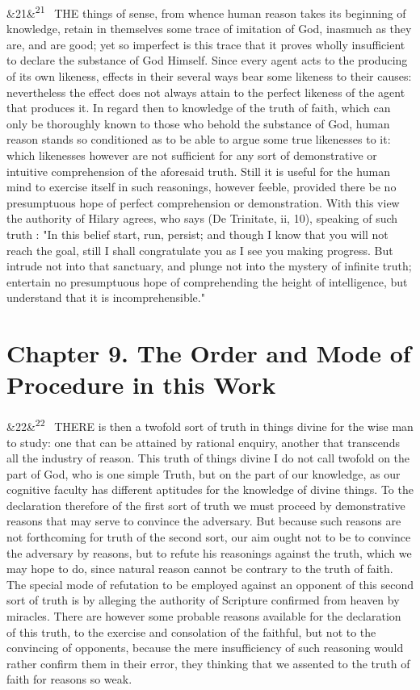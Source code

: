 \documentclass[12pt]{article}
\newcommand{\para}[1][]{\par\noindent\ifx&#1&\else\textsuperscript{\footnotesize #1}~\fi}
\begin{document}
\para[21] THE things of sense, from whence human reason takes its beginning of knowledge, retain in themselves some trace of imitation of God, inasmuch as they are, and are good; yet so imperfect is this trace that it proves wholly insufficient to declare the substance of God Himself. Since every agent acts to the producing of its own likeness, effects in their several ways bear some likeness to their causes: nevertheless the effect does not always attain to the perfect likeness of the agent that produces it. In regard then to knowledge of the truth of faith, which can only be thoroughly known to those who behold the substance of God, human reason stands so conditioned as to be able to argue some true likenesses to it: which likenesses however are not sufficient for any sort of demonstrative or intuitive comprehension of the aforesaid truth. Still it is useful for the human mind to exercise itself in such reasonings, however feeble, provided there be no presumptuous hope of perfect comprehension or demonstration. With this view the authority of Hilary agrees, who says (De Trinitate, ii, 10), speaking of such truth : "In this belief start, run, persist; and though I know that you will not reach the goal, still I shall congratulate you as I see you making progress. But intrude not into that sanctuary, and plunge not into the mystery of infinite truth; entertain no presumptuous hope of comprehending the height of intelligence, but understand that it is incomprehensible."

\section*{Chapter 9. The Order and Mode of Procedure in this Work}

\para[22] THERE is then a twofold sort of truth in things divine for the wise man to study: one that can be attained by rational enquiry, another that transcends all the industry of reason. This truth of things divine I do not call twofold on the part of God, who is one simple Truth, but on the part of our knowledge, as our cognitive faculty has different aptitudes for the knowledge of divine things. To the declaration therefore of the first sort of truth we must proceed by demonstrative reasons that may serve to convince the adversary. But because such reasons are not forthcoming for truth of the second sort, our aim ought not to be to convince the adversary by reasons, but to refute his reasonings against the truth, which we may hope to do, since natural reason cannot be contrary to the truth of faith. The special mode of refutation to be employed against an opponent of this second sort of truth is by alleging the authority of Scripture confirmed from heaven by miracles. There are however some probable reasons available for the declaration of this truth, to the exercise and consolation of the faithful, but not to the convincing of opponents, because the mere insufficiency of such reasoning would rather confirm them in their error, they thinking that we assented to the truth of faith for reasons so weak.
\end{document}
